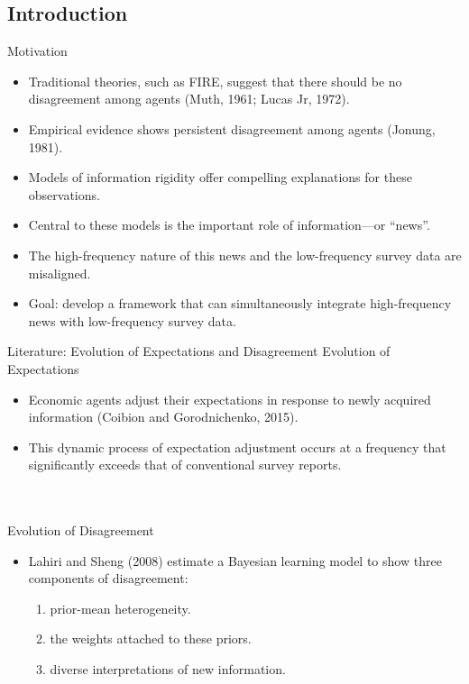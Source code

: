 \documentclass[UTF8, 10pt]{beamer}
\begin{document}
\begin{CJK*}{UTF8}{gbsn}
\section{Introduction}
\begin{frame}{Motivation}
	\begin{itemize}
		\item Traditional theories, such as \alert{FIRE}, suggest that there should be \alert{no disagreement} among agents (Muth, 1961; Lucas Jr, 1972).
		\item Empirical evidence shows \alert{persistent disagreement} among agents (Jonung, 1981).
		\item Models of \alert{information rigidity} offer compelling explanations for these observations.
		\item Central to these models is the important role of information—or ``\alert{news}''.
		\item The \alert{high-frequency} nature of this news and the \alert{low-frequency} survey data are \alert{misaligned}.
		\item Goal: develop a framework that can \alert{simultaneously integrate} high-frequency news with low-frequency survey data.
	\end{itemize}
\end{frame}
\begin{frame}{Literature: Evolution of Expectations and Disagreement}
	Evolution of Expectations
		\begin{itemize}
			\item Economic agents \alert{adjust their expectations} in response to \alert{newly acquired information}
				(Coibion and Gorodnichenko, 2015).
			\item This dynamic process of expectation adjustment occurs at a \alert{frequency} that \alert{significantly exceeds} that of conventional survey reports.
		\end{itemize}
	\\ \ \\
	Evolution of Disagreement
		\begin{itemize}
			\item Lahiri and Sheng (2008) estimate a Bayesian learning model to show three components of disagreement:
				\begin{enumerate}
					\item \alert{prior-mean} heterogeneity.
					\item the \alert{weights} attached to these priors.
					\item diverse \alert{interpretations} of new information.

\end{enumerate}
\end{itemize}
\end{frame}
\end{CJK*}
\end{document}
